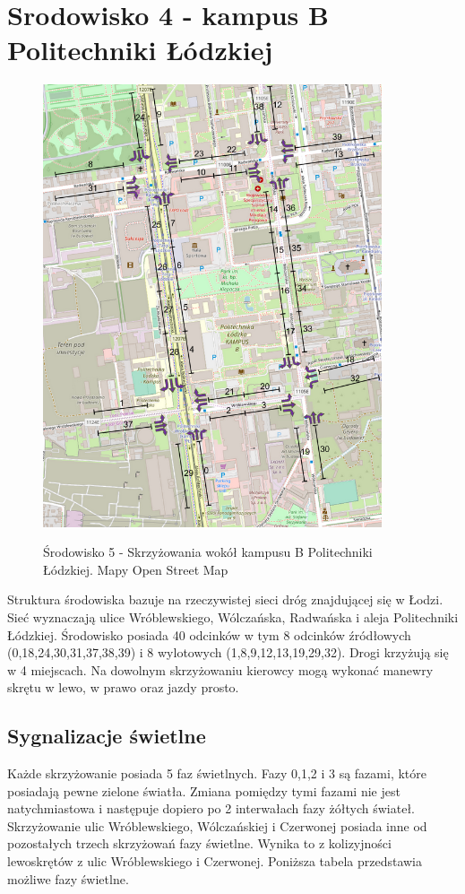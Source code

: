 \documentclass[12pt]{book}
\theoremstyle{plain}
\begin{document}
\section{Srodowisko 4 - kampus B Politechniki Łódzkiej}
\begin{figure}[H]
	\centering
	\includegraphics[width=10cm]{images/env_poli}
	\label{fig:env_poli}
	\centering
	\caption{Środowisko 5 - Skrzyżowania wokół kampusu B Politechniki Łódzkiej. Mapy Open Street Map}
\end{figure}
Struktura środowiska bazuje na rzeczywistej sieci dróg znajdującej się w Łodzi. Sieć wyznaczają ulice Wróblewskiego, Wólczańska, Radwańska i aleja Politechniki Łódzkiej. Środowisko posiada 40 odcinków w tym 8 odcinków źródłowych (0,18,24,30,31,37,38,39) i 8 wylotowych (1,8,9,12,13,19,29,32). Drogi krzyżują się w 4 miejscach. Na dowolnym skrzyżowaniu kierowcy mogą wykonać manewry skrętu w lewo, w prawo oraz jazdy prosto. 


\subsection{Sygnalizacje świetlne}
Każde skrzyżowanie posiada 5 faz świetlnych. Fazy 0,1,2 i 3 są fazami, które posiadają pewne zielone światła. Zmiana pomiędzy tymi fazami nie jest natychmiastowa i następuje dopiero po 2 interwałach fazy żółtych świateł. Skrzyżowanie ulic Wróblewskiego, Wólczańskiej i Czerwonej posiada inne od pozostałych trzech skrzyżowań fazy świetlne. Wynika to z kolizyjności lewoskrętów z ulic Wróblewskiego i Czerwonej. Poniższa tabela przedstawia możliwe fazy świetlne.
\end{document}
